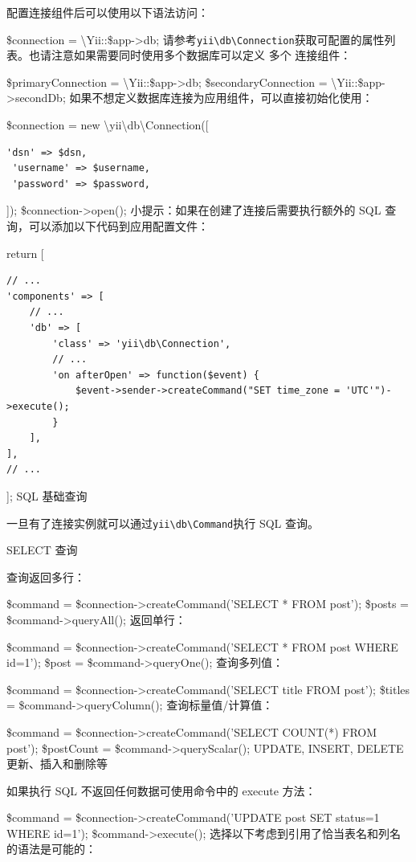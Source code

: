配置连接组件后可以使用以下语法访问：

\$connection = {\textbackslash}Yii::\$app->db;
请参考\texttt{yii{\allowbreak{}\textbackslash}db{\allowbreak{}\textbackslash}Connection}获取可配置的属性列表。也请注意如果需要同时使用多个数据库可以定义 多个 连接组件：

\$primaryConnection = {\textbackslash}Yii::\$app->db;
\$secondaryConnection = {\textbackslash}Yii::\$app->secondDb;
如果不想定义数据库连接为应用组件，可以直接初始化使用：

\$connection = new {\textbackslash}yii{\textbackslash}db{\textbackslash}Connection([

\begin{lstlisting}
'dsn' => $dsn,
 'username' => $username,
 'password' => $password,
\end{lstlisting}
]);
\$connection->open();
小提示：如果在创建了连接后需要执行额外的 SQL 查询，可以添加以下代码到应用配置文件：

return [

\begin{lstlisting}
// ...
'components' => [
    // ...
    'db' => [
        'class' => 'yii\db\Connection',
        // ...
        'on afterOpen' => function($event) {
            $event->sender->createCommand("SET time_zone = 'UTC'")->execute();
        }
    ],
],
// ...
\end{lstlisting}
];
SQL 基础查询

一旦有了连接实例就可以通过\texttt{yii{\allowbreak{}\textbackslash}db{\allowbreak{}\textbackslash}Command}执行 SQL 查询。

SELECT 查询

查询返回多行：

\$command = \$connection->createCommand('SELECT * FROM post');
\$posts = \$command->queryAll();
返回单行：

\$command = \$connection->createCommand('SELECT * FROM post WHERE id=1');
\$post = \$command->queryOne();
查询多列值：

\$command = \$connection->createCommand('SELECT title FROM post');
\$titles = \$command->queryColumn();
查询标量值/计算值：

\$command = \$connection->createCommand('SELECT COUNT(*) FROM post');
\$postCount = \$command->queryScalar();
UPDATE, INSERT, DELETE 更新、插入和删除等

如果执行 SQL 不返回任何数据可使用命令中的 execute 方法：

\$command = \$connection->createCommand('UPDATE post SET status=1 WHERE id=1');
\$command->execute();
选择以下考虑到引用了恰当表名和列名的语法是可能的：

